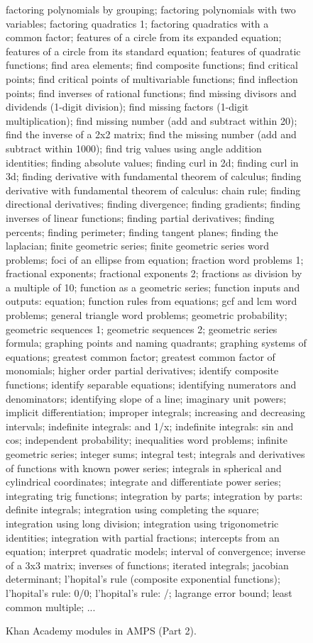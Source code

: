 \documentclass{article}
\begin{document}
\begin{figure*}
factoring polynomials by grouping; factoring polynomials with two variables; factoring quadratics 1; factoring quadratics with a common factor; features of a circle from its expanded equation; features of a circle from its standard equation; features of quadratic functions; find area elements; find composite functions; find critical points; find critical points of multivariable functions; find inflection points; find inverses of rational functions; find missing divisors and dividends (1-digit division); find missing factors (1-digit multiplication); find missing number (add and subtract within 20); find the inverse of a 2x2 matrix; find the missing number (add and subtract within 1000); find trig values using angle addition identities; finding absolute values; finding curl in 2d; finding curl in 3d; finding derivative with fundamental theorem of calculus; finding derivative with fundamental theorem of calculus: chain rule; finding directional derivatives; finding divergence; finding gradients; finding inverses of linear functions; finding partial derivatives; finding percents; finding perimeter; finding tangent planes; finding the laplacian; finite geometric series; finite geometric series word problems; foci of an ellipse from equation; fraction word problems 1; fractional exponents; fractional exponents 2; fractions as division by a multiple of 10; function as a geometric series; function inputs and outputs: equation; function rules from equations; gcf and lcm word problems; general triangle word problems; geometric probability; geometric sequences 1; geometric sequences 2; geometric series formula; graphing points and naming quadrants; graphing systems of equations; greatest common factor; greatest common factor of monomials; higher order partial derivatives; identify composite functions; identify separable equations; identifying numerators and denominators; identifying slope of a line; imaginary unit powers; implicit differentiation; improper integrals; increasing and decreasing intervals; indefinite integrals:  and 1/x; indefinite integrals: sin and cos; independent probability; inequalities word problems; infinite geometric series; integer sums; integral test; integrals and derivatives of functions with known power series; integrals in spherical and cylindrical coordinates; integrate and differentiate power series; integrating trig functions; integration by parts; integration by parts: definite integrals; integration using completing the square; integration using long division; integration using trigonometric identities; integration with partial fractions; intercepts from an equation; interpret quadratic models; interval of convergence; inverse of a 3x3 matrix; inverses of functions; iterated integrals; jacobian determinant; l'hopital's rule (composite exponential functions); l'hopital's rule: 0/0; l'hopital's rule: /; lagrange error bound; least common multiple; ...
\caption{Khan Academy modules in AMPS (Part 2).}
\label{fig:khan2}
\end{figure*}
\end{document}
